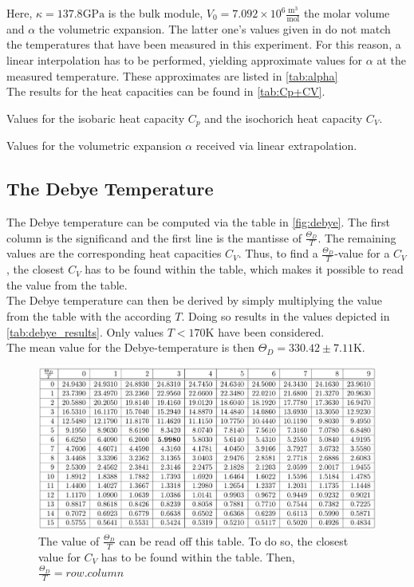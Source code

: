 Here, $\kappa = 137.8 \text{GPa}$ is the bulk module, $V_0 = 7.092 \times 10^6 \frac{\text{m}^3}{\text{mol}}$ the molar volume and $\alpha$ the volumetric expansion. The latter one's values given in \cite{Anleitung47} do not match the temperatures that have been measured in this experiment. For this reason, a linear interpolation has to be performed, yielding approximate values for $\alpha$ at the measured temperature. These approximates are listed in \autoref{tab:alpha}\\
The results for the heat capacities can be found in \autoref{tab:Cp+CV}.
\begin{table}
  \centering
  
  \caption{Values for the isobaric heat capacity $C_p$ and the isochorich heat capacity $C_V$.}
  \label{tab:Cp+CV}
\end{table}
\begin{table}
  \centering
  
  \caption{Values for the volumetric expansion $\alpha$ received via linear extrapolation.}
  \label{tab:alpha}
\end{table}

\subsection{The Debye Temperature}
The Debye temperature can be computed via the table in \autoref{fig:debye}. The first column is the significand and the first line is the mantisse of $\frac{\Theta_D}{T}$. The remaining values are the corresponding heat capacities $C_V$. Thus, to find a $\frac{\Theta_D}{T}$-value for a $C_V$, the closest $C_V$ has to be found within the table, which makes it possible to read the value from the table.\\
The Debye temperature can then be derived by simply multiplying the value from the table with the according $T$. Doing so results in the values depicted in \autoref{tab:debye_results}. Only values $T<170\text{K}$ have been considered.\\
The mean value for the Debye-temperature is then $\Theta_D = 330.42 \pm 7.11 \text{K}$.
\begin{figure}[h!]
  \centering
  \includegraphics[width=\textwidth]{figures/Debye_values.png}
  \caption{The value of $\frac{\Theta_D}{T}$ can be read off this table. To do so, the closest value for $C_V$ has to be found within the table. Then, $\frac{\Theta_D}{T} = \textit{row}.\textit{column}$}
  \label{fig:debye}
\end{figure}

